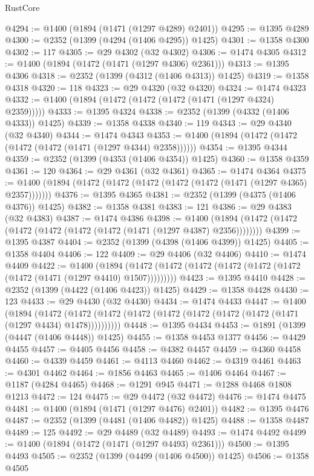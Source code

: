 \begin{lexlean}{RustCore}
\begin{coremodule}
@4294 := @1400 (@1894 (@1471 (@1297 @4289) @2401))
@4295 := @1395 @4289
@4300 := @2352 (@1399 (@4294 (@1406 @4295)) @1425)
@4301 := @1358 @4300
@4302 := 117
@4305 := @29 @4302 (@32 @4302)
@4306 := @1474 @4305
@4312 := @1400 (@1894 (@1472 (@1471 (@1297 @4306) @2361)))
@4313 := @1395 @4306
@4318 := @2352 (@1399 (@4312 (@1406 @4313)) @1425)
@4319 := @1358 @4318
@4320 := 118
@4323 := @29 @4320 (@32 @4320)
@4324 := @1474 @4323
@4332 := @1400 (@1894 (@1472 (@1472 (@1472 (@1471 (@1297 @4324) @2359)))))
@4333 := @1395 @4324
@4338 := @2352 (@1399 (@4332 (@1406 @4333)) @1425)
@4339 := @1358 @4338
@4340 := 119
@4343 := @29 @4340 (@32 @4340)
@4344 := @1474 @4343
@4353 := @1400 (@1894 (@1472 (@1472 (@1472 (@1472 (@1471 (@1297 @4344) @2358))))))
@4354 := @1395 @4344
@4359 := @2352 (@1399 (@4353 (@1406 @4354)) @1425)
@4360 := @1358 @4359
@4361 := 120
@4364 := @29 @4361 (@32 @4361)
@4365 := @1474 @4364
@4375 := @1400 (@1894 (@1472 (@1472 (@1472 (@1472 (@1472 (@1471 (@1297 @4365) @2357)))))))
@4376 := @1395 @4365
@4381 := @2352 (@1399 (@4375 (@1406 @4376)) @1425)
@4382 := @1358 @4381
@4383 := 121
@4386 := @29 @4383 (@32 @4383)
@4387 := @1474 @4386
@4398 := @1400 (@1894 (@1472 (@1472 (@1472 (@1472 (@1472 (@1472 (@1471 (@1297 @4387) @2356))))))))
@4399 := @1395 @4387
@4404 := @2352 (@1399 (@4398 (@1406 @4399)) @1425)
@4405 := @1358 @4404
@4406 := 122
@4409 := @29 @4406 (@32 @4406)
@4410 := @1474 @4409
@4422 := @1400
    (@1894 (@1472 (@1472 (@1472 (@1472 (@1472 (@1472 (@1472 (@1471 (@1297 @4410) @1507)))))))))
@4423 := @1395 @4410
@4428 := @2352 (@1399 (@4422 (@1406 @4423)) @1425)
@4429 := @1358 @4428
@4430 := 123
@4433 := @29 @4430 (@32 @4430)
@4434 := @1474 @4433
@4447 := @1400
    (@1894
      (@1472 (@1472 (@1472 (@1472 (@1472 (@1472 (@1472 (@1472 (@1471 (@1297 @4434) @1478))))))))))
@4448 := @1395 @4434
@4453 := @1891 (@1399 (@4447 (@1406 @4448)) @1425)
@4455 := @1358 @4453 @1377
@4456 := @4429 @4455
@4457 := @4405 @4456
@4458 := @4382 @4457
@4459 := @4360 @4458
@4460 := @4339 @4459
@4461 := @4113 @4460
@4462 := @4319 @4461
@4463 := @4301 @4462
@4464 := @1856 @4463
@4465 := @1406 @4464
@4467 := @1187 (@4284 @4465)
@4468 := @1291 @945
@4471 := @1288 @4468 @1808 @1213
@4472 := 124
@4475 := @29 @4472 (@32 @4472)
@4476 := @1474 @4475
@4481 := @1400 (@1894 (@1471 (@1297 @4476) @2401))
@4482 := @1395 @4476
@4487 := @2352 (@1399 (@4481 (@1406 @4482)) @1425)
@4488 := @1358 @4487
@4489 := 125
@4492 := @29 @4489 (@32 @4489)
@4493 := @1474 @4492
@4499 := @1400 (@1894 (@1472 (@1471 (@1297 @4493) @2361)))
@4500 := @1395 @4493
@4505 := @2352 (@1399 (@4499 (@1406 @4500)) @1425)
@4506 := @1358 @4505

\end{coremodule}
\end{lexlean}
